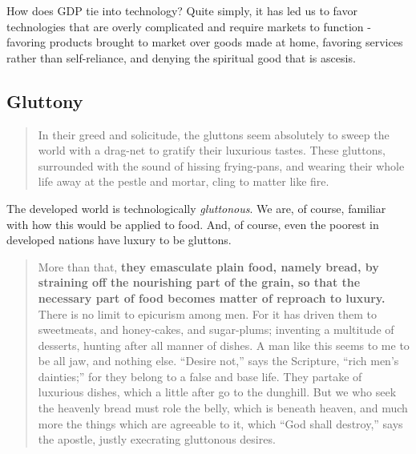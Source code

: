 \documentclass[letterpaper]{article}
\begin{document}
How does GDP tie into technology? Quite simply, it has led us to favor technologies that are overly complicated and require markets to function - favoring products brought to market over goods made at home, favoring services rather than self-reliance, and denying the spiritual good that is ascesis.


\iffalse
\subsection{Gnosticism}

Seeing these disconnecting patterns, the other heresy has become apparent in our times as well: the \textit{gnostic} heresy: that material things are flawed, evil, or are in some sense inauthentic or a distraction. These heretics have been throroughly rebuked by such saints as Irenaeus.
\fi

\subsection{Gluttony}

\begin{quote}
  In their greed and solicitude, the gluttons seem absolutely to sweep the world with a drag-net to gratify their luxurious tastes. These gluttons, surrounded with the sound of hissing frying-pans, and wearing their whole life away at the pestle and mortar, cling to matter like fire. 
\end{quote}

The developed world is technologically \textit{gluttonous}. We are, of course, familiar with how this would be applied to food. And, of course, even the poorest in developed nations have luxury to be gluttons.

\begin{quote}
  More than that, \textbf{they emasculate plain food, namely bread, by straining off the nourishing part of the grain, so that the necessary part of food becomes matter of reproach to luxury.} There is no limit to epicurism among men. For it has driven them to sweetmeats, and honey-cakes, and sugar-plums; inventing a multitude of desserts, hunting after all manner of dishes. A man like this seems to me to be all jaw, and nothing else. “Desire not,” says the Scripture, “rich men’s dainties;” for they belong to a false and base life. They partake of luxurious dishes, which a little after go to the dunghill. But we who seek the heavenly bread must role the belly, which is beneath heaven, and much more the things which are agreeable to it, which “God shall destroy,” says the apostle, justly execrating gluttonous desires.
\end{quote}
\end{document}

